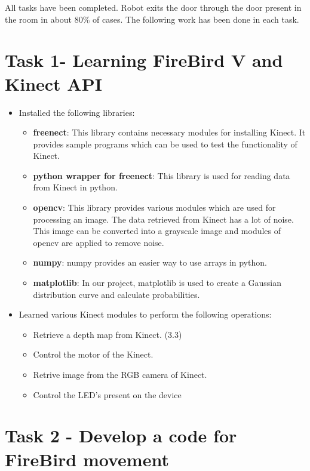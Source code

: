 \documentclass{report}
\begin{document}
All tasks have been completed. Robot exits the door through the door present in the room in about 80\% of cases.
The following work has been done in each task.

\section{Task 1- Learning FireBird V and Kinect API}
\begin{itemize}
\item Installed the following libraries:
\begin{itemize}
 \item \textbf{freenect}: This library contains necessary modules for installing Kinect. It provides sample 
			  programs which can be used to test the functionality of Kinect.
 \item \textbf{python wrapper for freenect}: This library is used for reading data from Kinect in python.
 \item \textbf{opencv}: This library provides various modules which are used for processing an image. The data retrieved from
			Kinect has a lot of noise. This image can be converted into a grayscale image and modules of opencv are applied to remove noise.
 \item \textbf{numpy}: numpy provides an easier way to use arrays in python.
 \item \textbf{matplotlib}: In our project, matplotlib is used to create a Gaussian distribution curve and calculate probabilities.
\end{itemize}

\item Learned various Kinect modules to perform the following operations:
\begin{itemize}
 \item Retrieve a depth map from Kinect. (3.3)
 \item Control the motor of the Kinect.
 \item Retrive image from the RGB camera of Kinect.
 \item Control the LED's present on the device
\end{itemize}

\end{itemize}

\section{Task 2 - Develop a code for FireBird movement}
\end{document}
